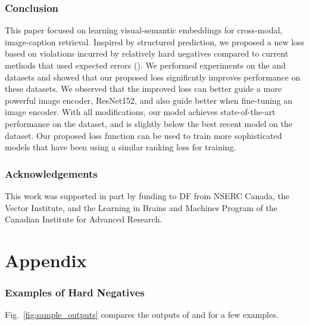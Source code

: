  \section{Conclusion}
This paper focused on learning visual-semantic embeddings for
cross-modal, image-caption retrieval.  Inspired by structured prediction, 
we proposed a new loss based on violations incurred by relatively hard 
negatives compared to current methods that used expected errors
(\cite{kiros2014unifying,vendrov2015order}). We performed experiments  
on the \coco{} and \fthk{} datasets and showed that our proposed loss 
significntly  improves performance on these datasets. We observed that 
the improved loss can better guide a more powerful image encoder, 
ResNet152, and also guide better when fine-tuning an image encoder. 
With all modifications, our \VSEpp{} model achieves state-of-the-art 
performance on the \coco{} dataset, and is slightly below the best 
recent model on the \fthk{} dataset.  Our proposed loss function can 
be used to train more sophisticated models that have been using a 
similar ranking loss for training.
 \section*{Acknowledgements}
This work was supported in part by funding to DF from NSERC Canada, 
the Vector Institute, and the Learning in Brains and Machines Program 
of the Canadian Institute for Advanced Research.




\ifdefined\arxivcopy
\newpage
\appendix
\part*{Appendix}
\setcounter{figure}{0}
\renewcommand\thefigure{\thesection.\arabic{figure}}
\section{Examples of Hard Negatives}

Fig.~\ref{fig:sample_outputs} compares the outputs of \VSEpp{} and \VSEz{} for 
a few examples.

